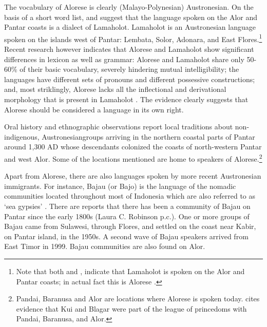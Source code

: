The vocabulary of Alorese is clearly (Malayo-Polynesian) Austronesian. On the basis of a short word list, \citet[9]{Stokhof1975} and \citet[645]{Steinhauer1993} suggest that the language spoken on the Alor and Pantar coasts is a dialect of Lamaholot. Lamaholot is an Austronesian language spoken on the islands west of Pantar: Lembata, Solor, Adonara, and East Flores.\footnote{Note that both \citet[275]{Barnes2001} and \citet[82]{Blust2009}, \citet[87]{Blust2013} indicate that Lamaholot is spoken on the Alor and Pantar coasts; in actual fact this is Alorese \citep[cf.][]{Klamer2011}.} Recent research however indicates that Alorese and Lamaholot show significant differences in lexicon as well as grammar: Alorese and Lamaholot share only 50-60\% of their basic vocabulary, severely hindering mutual intelligibility; the languages have different sets of pronouns and different possessive constructions; and, most striklingly, Alorese lacks all the inflectional and derivational morphology that is present in Lamaholot \citep{Klamer2011,Klamer2012}. The evidence clearly suggests that Alorese should be considered a language in its own right. 

Oral history and ethnographic observations \citep{Anonymous1914,Lemoine1969,Rodemeier2006} report local traditions about non-indigenous, Austronesian\linebreak groups arriving in {the northern coastal parts of Pantar around 1,300 AD whose} descendants colonized the coasts of north-western Pantar and west Alor. Some of the locations mentioned are home to speakers of Alorese.\footnote{Pandai, Baranusa and Alor are locations where Alorese is spoken today. \citet[38]{Hagerdal2012} cites evidence that Kui and Blagar were part of the league of princedoms with Pandai, Baranusa, and Alor.}    

Apart from Alorese, there are also languages spoken by more recent Austronesian immigrants. For instance, Bajau (or Bajo) is the language of the nomadic communities located throughout most of Indonesia which are also referred to as `sea gypsies' \citep[cf.][]{Verheijen1986}. There are reports that there has been a community of Bajau on Pantar since the early 1800s (Laura C. Robinson p.c.). One or more groups of Bajau came from Sulawesi, through Flores, and settled on the coast near Kabir, on Pantar island, in the 1950s. A second wave of Bajau speakers arrived from East Timor in 1999. Bajau communities are also found on Alor. 


